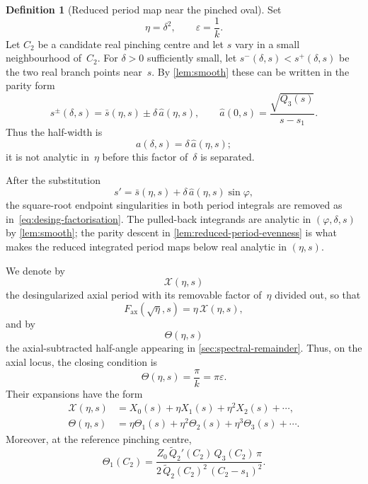 \documentclass[11pt,a4paper]{article}
\theoremstyle{plain}
\theoremstyle{definition}
\newtheorem{definition}[theorem]{Definition}
\theoremstyle{remark}
\begin{document}
\begin{definition}[Reduced period map near the pinched oval]
\label{def:reduced-period-map}
Set
\[
  \eta = \delta^2,
  \qquad
  \varepsilon = \frac1k .
\]
Let $C_2$ be a candidate real pinching centre and let $s$ vary in a
small neighbourhood of~$C_2$.  For $\delta>0$ sufficiently small, let
$s^-(\delta,s)<s^+(\delta,s)$ be the two real branch points near~$s$.
By \cref{lem:smooth} these can be written in the parity form
\[
  s^\pm(\delta,s)=\bar s(\eta,s)\pm \delta\,\widehat a(\eta,s),
  \qquad
  \widehat a(0,s)=\frac{\sqrt{Q_3(s)}}{s-s_1}.
\]
Thus the half-width is
\[
  a(\delta,s)=\delta\,\widehat a(\eta,s);
\]
it is not analytic in~$\eta$ before this factor of~$\delta$ is
separated.

After the substitution
\[
  s'=\bar s(\eta,s)+\delta\,\widehat a(\eta,s)\sin\varphi,
\]
the square-root endpoint singularities in both period integrals are
removed as in~\eqref{eq:desing-factorisation}.  The pulled-back
integrands are analytic in $(\varphi,\delta,s)$ by
\cref{lem:smooth}; the parity descent in
\cref{lem:reduced-period-evenness} is what makes the reduced
integrated period maps below real analytic in $(\eta,s)$.

We denote by
\[
  \mathcal X(\eta,s)
\]
the desingularized axial period with its removable factor of~$\eta$
divided out, so that
\[
  F_{\mathrm{ax}}(\sqrt\eta,s)=\eta\,\mathcal X(\eta,s),
\]
and by
\[
  \Theta(\eta,s)
\]
the axial-subtracted half-angle appearing in
\cref{sec:spectral-remainder}.  Thus, on the axial locus, the
closing condition is
\[
  \Theta(\eta,s)=\frac{\pi}{k}=\pi\varepsilon .
\]
Their expansions have the form
\begin{align}
  \mathcal X(\eta,s)
  &= X_0(s)+\eta X_1(s)+\eta^2X_2(s)+\cdots,
  \label{eq:X-expansion}\\
  \Theta(\eta,s)
  &= \eta\Theta_1(s)+\eta^2\Theta_2(s)+\eta^3\Theta_3(s)+\cdots .
  \label{eq:Theta-expansion}
\end{align}
Moreover, at the reference pinching centre,
\begin{equation}\label{eq:Theta1-value}
  \Theta_1(C_2)
  =
  \frac{Z_0\,\tilde Q_2'(C_2)\,Q_3(C_2)\,\pi}
       {2\,\tilde Q_2(C_2)^2\,(C_2-s_1)^2}.
\end{equation}
\end{definition}
\end{document}
